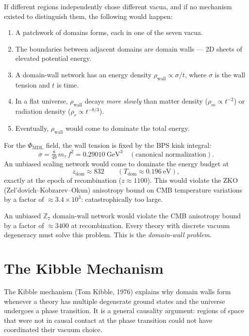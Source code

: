 \documentclass[11pt,a4paper]{article}
\newcommand{\PHIMDL}{\Phi_{\mathrm{MDL}}}
\newcommand{\ZS}{\mathbb{Z}_7}
\begin{document}
If different regions independently chose different vacua, and if no mechanism
existed to distinguish them, the following would happen:

\begin{enumerate}
\item A patchwork of domains forms, each in one of the seven vacua.
\item The boundaries between adjacent domains are domain walls --- 2D sheets
      of elevated potential energy.
\item A domain-wall network has an energy density $\rho_\mathrm{wall} \propto
      \sigma / t$, where $\sigma$ is the wall tension and $t$ is time.
\item In a flat universe, $\rho_\mathrm{wall}$ decays \emph{more slowly} than
      matter density ($\rho_m \propto t^{-2}$) or radiation density
      ($\rho_r \propto t^{-8/3}$).
\item Eventually, $\rho_\mathrm{wall}$ would come to dominate the total energy.
\end{enumerate}

For the $\PHIMDL$ field, the wall tension is fixed by the BPS kink integral:
\[
  \sigma = \tfrac{8}{49}\,m_\tau\,f^2 = 0.29010~\text{GeV}^3
  \quad (\text{canonical normalization}).
\]
An unbiased scaling network would come to dominate the energy budget at
\[
  z_\mathrm{dom} \approx 832 \qquad (T_\mathrm{dom} \approx 0.196~\text{eV}),
\]
exactly at the epoch of recombination ($z \approx 1100$).
This would violate the ZKO (Zel'\-dovich--Kobza\-rev--Okun) anisotropy bound
on CMB temperature variations by a factor of
$\approx 3.4 \times 10^3$: catastrophically too large.

\begin{tcolorbox}[colback=boxred,colframe=red!50!black,
  title={The catastrophe, quantified}]
An unbiased $\ZS$ domain-wall network would violate the CMB anisotropy bound
by a factor of $\approx 3400$ at recombination.
Every theory with discrete vacuum degeneracy must solve this problem.
This is the \textit{domain-wall problem}.
\end{tcolorbox}

\section{The Kibble Mechanism}

\begin{tcolorbox}[colback=boxblue,colframe=blue!40!black,title=Key idea]
The Kibble mechanism (Tom Kibble, 1976) explains why domain walls form whenever
a theory has multiple degenerate ground states and the universe undergoes a
phase transition.
It is a general causality argument: regions of space that were not in causal
contact at the phase transition could not have coordinated their vacuum choice.
\end{tcolorbox}
\end{document}
